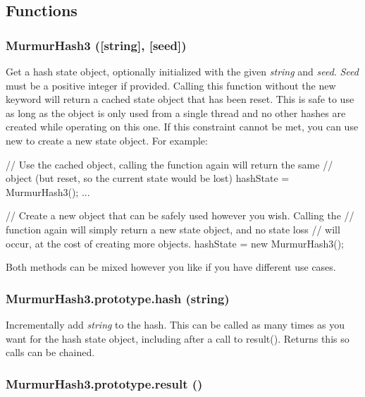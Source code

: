 \subsection*{Functions }

\subsubsection*{Murmur\+Hash3 (\mbox{[}string\mbox{]}, \mbox{[}seed\mbox{]})}

Get a hash state object, optionally initialized with the given {\itshape string} and {\itshape seed}. {\itshape Seed} must be a positive integer if provided. Calling this function without the {\ttfamily new} keyword will return a cached state object that has been reset. This is safe to use as long as the object is only used from a single thread and no other hashes are created while operating on this one. If this constraint cannot be met, you can use {\ttfamily new} to create a new state object. For example\+:


\begin{DoxyCode}
// Use the cached object, calling the function again will return the same
// object (but reset, so the current state would be lost)
hashState = MurmurHash3();
...

// Create a new object that can be safely used however you wish. Calling the
// function again will simply return a new state object, and no state loss
// will occur, at the cost of creating more objects.
hashState = new MurmurHash3();
\end{DoxyCode}


Both methods can be mixed however you like if you have different use cases. 



\subsubsection*{Murmur\+Hash3.\+prototype.\+hash (string)}

Incrementally add {\itshape string} to the hash. This can be called as many times as you want for the hash state object, including after a call to {\ttfamily result()}. Returns {\ttfamily this} so calls can be chained. 



\subsubsection*{Murmur\+Hash3.\+prototype.\+result ()}

